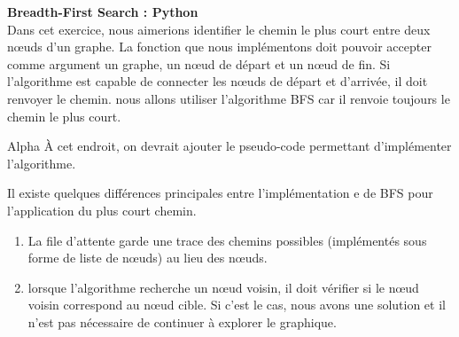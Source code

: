 \begin{Exercice}[15 minutes]\textbf{Breadth-First Search : Python
}\\
	Dans cet exercice, nous aimerions identifier le chemin le plus court entre deux nœuds d'un graphe.
	La fonction que nous implémentons doit pouvoir accepter comme argument un graphe, un nœud de départ et un nœud de fin. Si l'algorithme est capable de connecter les nœuds 			de départ et d'arrivée, il doit renvoyer le chemin. nous allons utiliser l'algorithme BFS car il renvoie toujours le chemin le plus court.\\
	\begin{note}{Alpha}
		À cet endroit, on devrait ajouter le pseudo-code permettant d'implémenter l'algorithme.
	\end{note}

	
    	\begin{conseil}
		Il existe quelques différences principales entre l'implémentation e de BFS pour l'application du plus court chemin.
        		\begin{enumerate}
			\item La file d'attente garde une trace des chemins possibles (implémentés sous forme de liste de nœuds) au lieu des nœuds.
	           	\item lorsque l'algorithme recherche un nœud voisin, il doit vérifier si le nœud voisin correspond au nœud cible. Si c'est le cas, nous avons une solution et il n'est pas 					nécessaire de continuer à explorer le graphique.
        		\end{enumerate}

    	\end{conseil}

	\begin{solution}
		
	\end{solution}
\end{Exercice}

